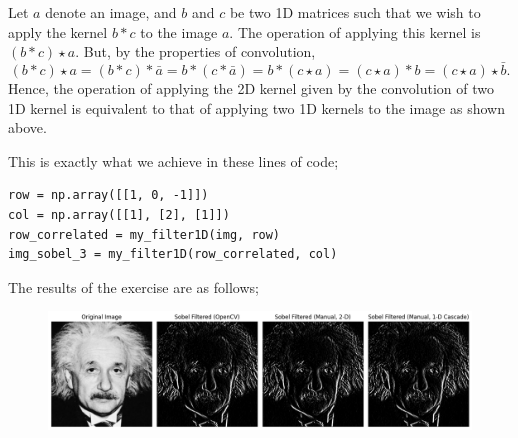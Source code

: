 \documentclass{article}[a4paper]
\begin{document}
\begin{enumerate}
	Let $a$ denote an image, and $b$ and $c$ be two 1D matrices such that we wish to apply the kernel $b \ast c$ to the image $a$. The operation
	of applying this kernel is $(b \ast c) \star a$. But, by the properties of convolution, \[
		(b \ast c) \star a = (b \ast c) \ast \bar{a} = b \ast (c \ast \bar{a}) = b \ast (c \star a) = (c \star a) \ast b = (c \star a) \star \bar{b}.
	\] Hence, the operation of applying the 2D kernel given by the convolution of two 1D kernel is equivalent to that of applying two 1D kernels to the 
	image as shown above.

	This is exactly what we achieve in these lines of code;
	\begin{lstlisting}
row = np.array([[1, 0, -1]])
col = np.array([[1], [2], [1]])
row_correlated = my_filter1D(img, row)
img_sobel_3 = my_filter1D(row_correlated, col)
	\end{lstlisting}

	The results of the exercise are as follows;
	\begin{figure}[H]
		\centering
		\includegraphics[width=0.9\linewidth]{images/q7.png}
	\end{figure}
	

\end{enumerate}
\end{document}
